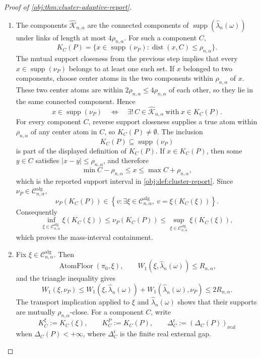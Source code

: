 \begin{proof}[Proof of \cref{obj:thm:cluster-adaptive-report}]
\begin{enumerate}
\item The components \(\widehat{\mathscr K}_{n,\alpha}\) are the connected
components of \(\operatorname{supp}(\widehat\lambda_n(\omega))\) under links of
length at most \(4\rho_{n,\alpha}\).  For such a component \(C\),
\[
K_C(P)
=
\{x\in\operatorname{supp}(\nu_P):\operatorname{dist}(x,C)\le\rho_{n,\alpha}\}.
\]
The mutual support closeness from the previous step implies that every
\(x\in\operatorname{supp}(\nu_P)\) belongs to at least one such set.  If \(x\)
belonged to two components, choose center atoms in the two components within
\(\rho_{n,\alpha}\) of \(x\).  These two center atoms are within
\(2\rho_{n,\alpha}\le4\rho_{n,\alpha}\) of each other, so they lie in the same
connected component.  Hence
\[
x\in\operatorname{supp}(\nu_P)
\quad\Longleftrightarrow\quad
\exists!\,C\in\widehat{\mathscr K}_{n,\alpha}\ \text{with}\ x\in K_C(P).
\]
For every component \(C\), reverse support closeness supplies a true atom within
\(\rho_{n,\alpha}\) of any center atom in \(C\), so \(K_C(P)\ne\emptyset\).
The inclusion
\[
K_C(P)\subseteq\operatorname{supp}(\nu_P)
\]
is part of the displayed definition of \(K_C(P)\).  If \(x\in K_C(P)\), then
some \(y\in C\) satisfies \(|x-y|\le\rho_{n,\alpha}\), and therefore
\[
\min C-\rho_{n,\alpha}\le x\le \max C+\rho_{n,\alpha},
\]
which is the reported support interval in \cref{obj:def:cluster-report}.  Since
\(\nu_P\in\mathcal C^{\mathrm{alg}}_{n,\alpha}\),
\[
\nu_P(K_C(P))\in
\left\{v:\exists \xi\in\mathcal C^{\mathrm{alg}}_{n,\alpha},\
v=\xi(K_C(\xi))\right\}.
\]
Consequently
\[
\inf_{\xi\in\mathcal C^{\mathrm{alg}}_{n,\alpha}}\xi(K_C(\xi))
\le
\nu_P(K_C(P))
\le
\sup_{\xi\in\mathcal C^{\mathrm{alg}}_{n,\alpha}}\xi(K_C(\xi)),
\]
which proves the mass-interval containment. %

\item Fix \(\xi\in\mathcal C^{\mathrm{alg}}_{n,\alpha}\).  Then
\[
\operatorname{AtomFloor}(\pi_0,\xi),
\qquad
W_1(\xi,\widehat\lambda_n(\omega))\le R_{n,\alpha},
\]
and the triangle inequality gives
\[
W_1(\xi,\nu_P)
\le
W_1(\xi,\widehat\lambda_n(\omega))
+
W_1(\widehat\lambda_n(\omega),\nu_P)
\le 2R_{n,\alpha}.
\]
The transport implication applied to \(\xi\) and \(\widehat\lambda_n(\omega)\)
shows that their supports are mutually \(\rho_{n,\alpha}\)-close.  For a
component \(C\), write
\[
K_C^\xi:=K_C(\xi),
\qquad
K_C^P:=K_C(P),
\qquad
\Delta_C^{\mathrm r}:=(\Delta_C(P))_{\mathrm{real}}
\]
when \(\Delta_C(P)<+\infty\), where \(\Delta_C^{\mathrm r}\) is the finite real
external gap.


\end{enumerate}
\end{proof}

